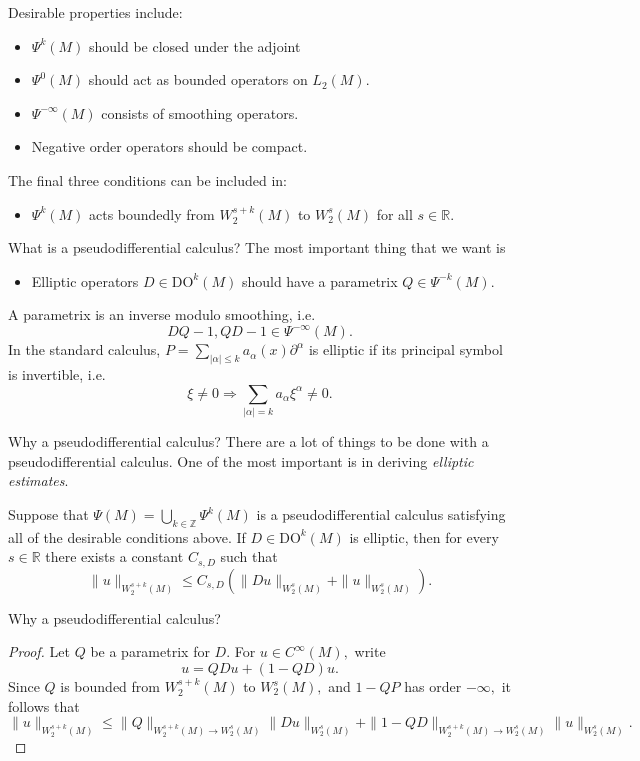 \documentclass{beamer}
\numberwithin{equation}{section}
\theoremstyle{plain}
\theoremstyle{plain}
\theoremstyle{definition}
\theoremstyle{plain}
\theoremstyle{plain}
\theoremstyle{definition}
\newcommand{\Rl}{\mathbb{R}}
\newcommand{\Itgr}{\mathbb{Z}}
\begin{document}
\begin{frame}
  Desirable properties include:
  \begin{itemize}
    \item{} $\Psi^k(M)$ should be closed under the adjoint
    \item{} $\Psi^0(M)$ should act as bounded operators on $L_2(M).$
    \item{} $\Psi^{-\infty}(M)$ consists of smoothing operators.
    \item{} Negative order operators should be compact.
  \end{itemize}\pause
  The final three conditions can be included in:
  \begin{itemize}
    \item{} $\Psi^k(M)$ acts boundedly from $W^{s+k}_2(M)$ to $W^{s}_2(M)$ for all $s\in \Rl.$
  \end{itemize}
\end{frame}

\begin{frame}{What is a pseudodifferential calculus?}
  The most important thing that we want is 
  \begin{itemize}
    \item{} Elliptic operators $D\in \mathrm{DO}^k(M)$ should have a parametrix $Q \in \Psi^{-k}(M).$
  \end{itemize}
  A parametrix is an inverse modulo smoothing, i.e.
  \[
    DQ-1,QD-1 \in \Psi^{-\infty}(M).
  \]
  \pause
  In the standard calculus, $P=\sum_{|\alpha|\leq k} a_{\alpha}(x)\partial^{\alpha}$ is elliptic if its principal symbol is invertible, i.e.
  \[
    \xi\neq 0\Rightarrow \sum_{|\alpha|=k} a_{\alpha}\xi^{\alpha} \neq 0.
  \]
\end{frame}

\begin{frame}{Why a pseudodifferential calculus?}
  There are a lot of things to be done with a pseudodifferential calculus. One of the most important is in deriving \emph{elliptic estimates}.
  \begin{lemma}
    Suppose that $\Psi(M) = \bigcup_{k\in \Itgr} \Psi^k(M)$ is a pseudodifferential calculus satisfying all of the desirable conditions above. If $D\in \mathrm{DO}^k(M)$ is elliptic, then for every $s \in \Rl$ there exists a constant $C_{s,D}$ such that
    \[
      \|u\|_{W^{s+k}_2(M)} \leq C_{s,D}(\|Du\|_{W^s_2(M)} + \|u\|_{W^{s}_2(M)}).
    \]
  \end{lemma}
\end{frame}
\begin{frame}{Why a pseudodifferential calculus?}
  \begin{proof}
    Let $Q$ be a parametrix for $D.$ For $u\in C^\infty(M),$ write
    \[
        u = QDu+(1-QD)u.
    \]  
    Since $Q$ is bounded from $W^{s+k}_2(M)$ to $W^{s}_2(M),$ and $1-QP$ has order $-\infty,$ it follows that
    \[
        \|u\|_{W^{s+k}_2(M)} \leq \|Q\|_{W^{s+k}_2(M)\to W^s_2(M)}\|Du\|_{W^s_2(M)}+\|1-QD\|_{W^{s+k}_2(M)\to W^s_2(M)}\|u\|_{W^s_2(M)}.
    \]
  \end{proof}
\end{frame}
\end{document}
